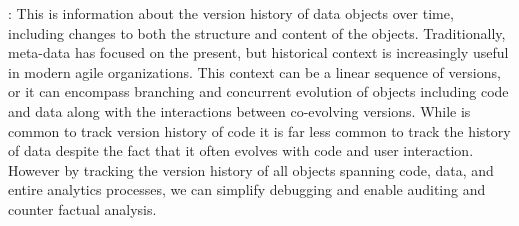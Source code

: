 \documentclass{sig-alternate}
\begin{document}
: This is information about the version history of data objects over time, including changes to both the structure and content of the objects. 
Traditionally, meta-data has focused on the present, but historical context is increasingly useful in modern agile organizations.
This context can be a linear sequence of versions, or it can encompass branching and concurrent evolution of objects including code and data along with the interactions between co-evolving versions.
While is common to track version history of code it is far less common to track the history of data despite the fact that it often evolves with code and user interaction. 
However by tracking the version history of all objects spanning code, data, and entire analytics processes, we can simplify debugging and enable auditing and counter factual analysis.



\end{document}

